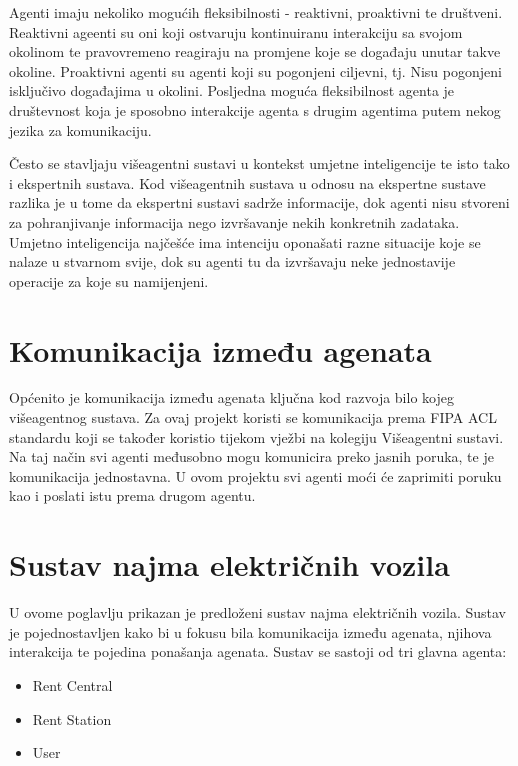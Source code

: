 \documentclass{foi}
\begin{document}
Agenti imaju nekoliko mogućih fleksibilnosti - reaktivni, proaktivni te društveni. Reaktivni ageenti su oni koji ostvaruju kontinuiranu interakciju sa svojom okolinom te pravovremeno reagiraju na promjene koje se događaju unutar takve okoline. Proaktivni agenti su agenti koji su pogonjeni ciljevni, tj. Nisu pogonjeni isključivo događajima u okolini. Posljedna moguća fleksibilnost agenta je društevnost koja je sposobno interakcije agenta s drugim agentima putem nekog jezika za komunikaciju.

Često se stavljaju višeagentni sustavi u kontekst umjetne inteligencije te isto tako i ekspertnih sustava. Kod višeagentnih sustava u odnosu na ekspertne sustave razlika je u tome da ekspertni sustavi sadrže informacije, dok agenti nisu stvoreni za pohranjivanje informacija nego izvršavanje nekih konkretnih zadataka. Umjetno inteligencija najčešće ima intenciju oponašati razne situacije koje se nalaze u stvarnom svije, dok su agenti tu da izvršavaju neke jednostavije operacije za koje su namijenjeni.

\section{Komunikacija između agenata}

Općenito je komunikacija između agenata ključna kod razvoja bilo kojeg višeagentnog sustava. Za ovaj projekt koristi se komunikacija prema FIPA ACL standardu koji se također koristio tijekom vježbi na kolegiju Višeagentni sustavi. Na taj način svi agenti međusobno mogu komunicira preko jasnih poruka, te je komunikacija jednostavna. U ovom projektu svi agenti moći će zaprimiti poruku kao i poslati istu prema drugom agentu.
\pagebreak

\section{Sustav najma električnih vozila}

U ovome poglavlju prikazan je predloženi sustav najma električnih vozila. Sustav je pojednostavljen kako bi u fokusu bila komunikacija između agenata, njihova interakcija te pojedina ponašanja agenata. Sustav se sastoji od tri glavna agenta:

\begin{itemize}
	\item Rent Central
	\item Rent Station
	\item User
\end{itemize}
\end{document}
